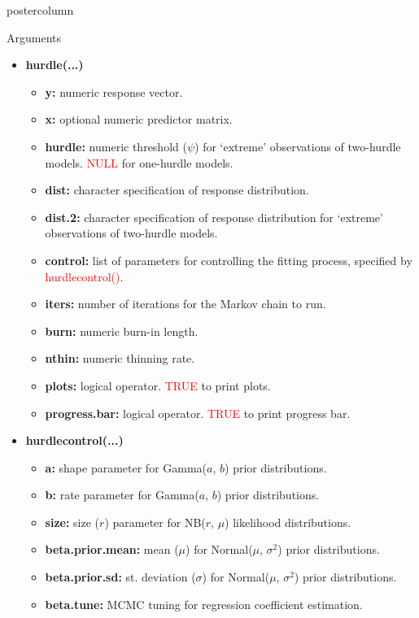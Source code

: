 \documentclass[final]{beamer}\usepackage[]{graphicx}\usepackage[]{color}
\newcommand{\red}{\textcolor{red}}
\begin{document}
{\begin{frame}
\begin{columns}
\begin{column}{.33\textwidth}
\begin{beamercolorbox}[center,wd=\textwidth]{postercolumn}
\begin{minipage}[T]{.97\textwidth}
{\begin{block}{Arguments}
\begin{itemize}
	\item \textbf{hurdle(...)}
	\begin{itemize}
		\item \textbf{y:} numeric response vector.
		\item \textbf{x:} optional numeric predictor matrix.
		\item \textbf{hurdle:} numeric threshold ($\psi$) for `extreme' observations of two-hurdle models. \red{NULL} for one-hurdle models.
		\item \textbf{dist:} character specification of response distribution.
		\item \textbf{dist.2:} character specification of response distribution for `extreme' observations of two-hurdle models.
		\item \textbf{control:} list of parameters for controlling the fitting process, specified by \red{hurdle\textunderscore control()}.
		\item \textbf{iters:} number of iterations for the Markov chain to run. 
		\item \textbf{burn:} numeric burn-in length.
		\item \textbf{nthin:} numeric thinning rate.
		\item \textbf{plots:} logical operator. \red{TRUE} to print plots. 
		\item \textbf{progress.bar:} logical operator. \red{TRUE} to print progress bar. 
	\end{itemize}
	\begin{center}
		\vspace{-0.5cm}
	\end{center}
	\item \textbf{hurdle\textunderscore control(...)}
	\begin{itemize}
		\item \textbf{a:} shape parameter for Gamma($a$, $b$) prior distributions.
		\item \textbf{b:} rate parameter for Gamma($a$, $b$) prior distributions.
		\item \textbf{size:} size ($r$) parameter for NB($r$, $\mu$) likelihood distributions.
		\item \textbf{beta.prior.mean:} mean ($\mu$) for Normal($\mu$, $\sigma^{2}$) prior distributions.
		\item \textbf{beta.prior.sd:} st. deviation ($\sigma$) for Normal($\mu$, $\sigma^{2}$) prior distributions.
		\item \textbf{beta.tune:} MCMC tuning for regression coefficient estimation.

\end{itemize}
\end{itemize}
\end{block}}
\end{minipage}
\end{beamercolorbox}
\end{column}
\end{columns}
\end{frame}}
\end{document}

